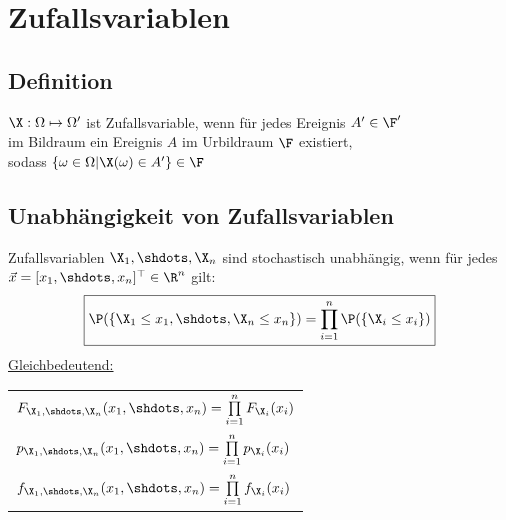 \documentclass[german,color,6pt]{latex4ei/latex4ei_sheet}
\begin{document}
\section{Zufallsvariablen}
\vspace{-0.25cm}
\begin{sectionbox}
	\vspace{-0.05cm}
	\subsection{Definition}
	$\X : \Omega \mapsto \Omega'$ ist Zufallsvariable, wenn für jedes Ereignis $A' \in \F'$  \\
	im Bildraum ein Ereignis $A$ im Urbildraum $\F$ existiert, \\
	sodass $\left\{\omega \in \Omega|\X(\omega) \in A'\right\} \in \F$
\end{sectionbox}
\vspace{-0.2cm}
\begin{sectionbox}
	\subsection{Unabhängigkeit von Zufallsvariablen}
	Zufallsvariablen $\X_1,\shdots,\X_n$ sind stochastisch unabhängig, wenn für jedes $\vec{x} = [x_1,\shdots,x_n]^\top \in \R^n$ gilt:
	\[\boxed{\P(\{\X_1 \leq x_1,\shdots,\X_n \leq x_n\}) = \prod\limits_{i=1}^{n}{\P(\{\X_i \leq x_i\})}}\]
	\underline{Gleichbedeutend:}
	\begin{tabular}{l}
		$F_{\X_1,\shdots,\X_n}(x_1,\shdots,x_n) = \prod\limits_{i=1}^{n}{F_{\X_i}(x_i)}$\\
		$p_{\X_1,\shdots,\X_n}(x_1,\shdots,x_n) = \prod\limits_{i=1}^{n}{p_{\X_i}(x_i)}$\\
		$f_{\X_1,\shdots,\X_n}(x_1,\shdots,x_n) = \prod\limits_{i=1}^{n}{f_{\X_i}(x_i)}$\\
	\end{tabular}
\end{sectionbox}
\vspace{-0.2cm}
\end{document}
